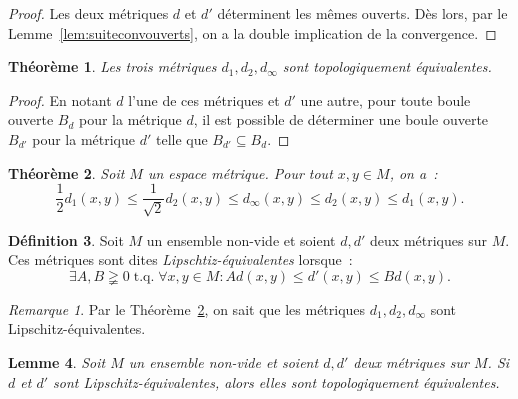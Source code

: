 \documentclass{report}
\newtheorem{thm}{Théorème}[section]
\newtheorem{lem}[thm]{Lemme}
\theoremstyle{definition}
\newtheorem{déf}[thm]{Définition}
\theoremstyle{remark}
\newtheorem*{rmq}{Remarque}
\DeclareMathOperator{\tq}{\text{ t.q. }}
\begin{document}
		\begin{proof} Les deux métriques $d$ et $d'$ déterminent les mêmes ouverts. Dès lors, par le Lemme~\ref{lem:suiteconvouverts}, on a la double implication
		de la convergence.
		\end{proof}
		
		\begin{thm} Les trois métriques $d_1, d_2, d_\infty$ sont topologiquement équivalentes.
		\end{thm}
		
		\begin{proof} En notant $d$ l'une de ces métriques et $d'$ une autre, pour toute boule ouverte $B_d$ pour la métrique $d$, il est possible de déterminer une
		boule ouverte $B_{d'}$ pour la métrique $d'$ telle que $B_{d'} \subseteq B_d$.
		\end{proof}
		
		\begin{thm}\label{thm:d1d2dinflipschitzeq} Soit $M$ un espace métrique. Pour tout $x, y \in M$, on a~:
		\[\frac 12 d_1(x, y) \leq \frac 1{\sqrt 2}d_2(x, y) \leq d_\infty(x, y) \leq d_2(x, y) \leq d_1(x, y).\]
		\end{thm}
		
		\begin{déf} Soit $M$ un ensemble non-vide et soient $d, d'$ deux métriques sur $M$. Ces métriques sont dites \textit{Lipschtiz-équivalentes} lorsque~:
		\[\exists A, B \gneqq 0 \tq \forall x, y \in M : Ad(x, y) \leq d'(x, y) \leq Bd(x, y).\]
		\end{déf}
		
		\begin{rmq} Par le Théorème~\ref{thm:d1d2dinflipschitzeq}, on sait que les métriques $d_1, d_2, d_\infty$ sont Lipschitz-équivalentes.
		\end{rmq}
		
		\begin{lem} Soit $M$ un ensemble non-vide et soient $d, d'$ deux métriques sur $M$. Si $d$ et $d'$ sont Lipschitz-équivalentes, alors elles sont topologiquement
		équivalentes.
		\end{lem}

\end{document}
